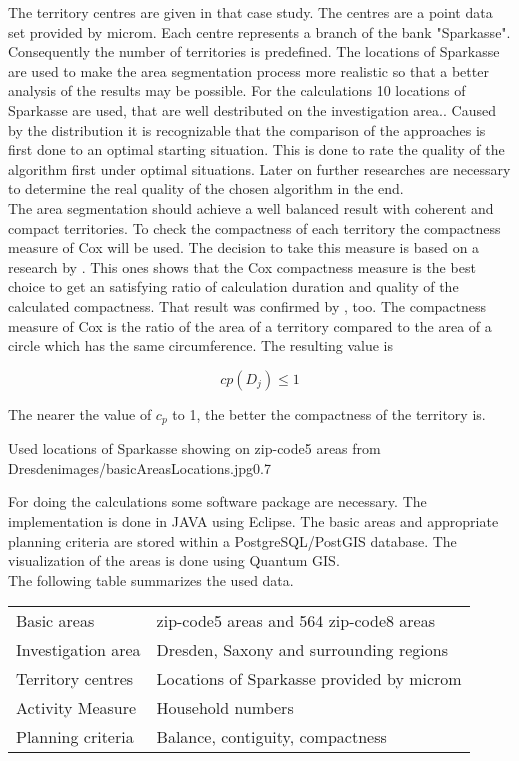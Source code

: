 The territory centres are given in that case study. The centres are a point data set provided by microm. Each centre represents a branch of the bank "Sparkasse". Consequently the number of territories is predefined. The locations of Sparkasse are used to make the area segmentation process more realistic so that a better analysis of the results may be possible. For the calculations 10 locations of Sparkasse are used, that are well destributed on the investigation area.. Caused by the distribution it is recognizable that the comparison of the approaches is first done to an optimal starting situation. This is done to rate the quality of the algorithm first under optimal situations. Later on further researches are necessary to determine the real quality of the chosen algorithm in the end. \\
The area segmentation should achieve a well balanced result with coherent and compact territories. To check the compactness of each territory the compactness measure of Cox will be used. The decision to take this measure is based on a research by \citeauthor{koehler} \cite{koehler}. This ones shows that the Cox compactness measure is the best choice to get an satisfying ratio of calculation duration and quality of the calculated compactness. That result was confirmed by \citeauthor{kit_com} \cite{kit_com}, too. The compactness measure of Cox is the ratio of the area of a territory compared to the area of a circle which has the same circumference. The resulting value is

\[ \mathit{cp(D_{j})  \leq   1}\]


The nearer the value of $c_{p}$ to 1, the better the compactness of the territory is.

\begin{figurevarSize}{Used locations of Sparkasse showing on zip-code5 areas from Dresden}{images/basicAreasLocations.jpg}{0.7}\end{figurevarSize}

For doing the calculations some software package are necessary. The implementation is done in JAVA using Eclipse. The basic areas and appropriate planning criteria are stored within a PostgreSQL/PostGIS database. The visualization of the areas is done using Quantum GIS. \\
The following table summarizes the used data.



\begin{table}[H]
	\begin{tabular}{|p{3.5cm}|>{\RaggedRight}p{9.5cm}|}
		\hline
		& \centering{Detailed information} \tabularnewline
		\hline
		Basic areas & 37 zip-code5 areas and 564 zip-code8 areas
		\tabularnewline
		\hline
		Investigation area & Dresden, Saxony and surrounding regions
		\tabularnewline
		\hline
		Territory centres & Locations of Sparkasse provided by microm
		\tabularnewline
		\hline
		Activity Measure & Household numbers
		\tabularnewline
		\hline
		Planning criteria & Balance, contiguity, compactness
		\tabularnewline
		\hline
	\end{tabular}
\end{table}


